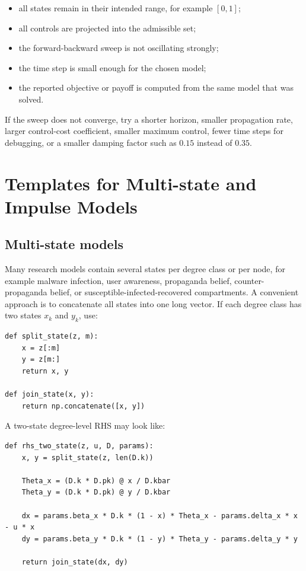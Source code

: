 \documentclass[11pt,a4paper]{article}
\begin{document}
\begin{itemize}
  \item all states remain in their intended range, for example \([0,1]\);
  \item all controls are projected into the admissible set;
  \item the forward-backward sweep is not oscillating strongly;
  \item the time step is small enough for the chosen model;
  \item the reported objective or payoff is computed from the same model that was solved.
\end{itemize}

If the sweep does not converge, try a shorter horizon, smaller propagation rate, larger control-cost coefficient, smaller maximum control, fewer time steps for debugging, or a smaller damping factor such as \(0.15\) instead of \(0.35\).

\section{Templates for Multi-state and Impulse Models}

\subsection{Multi-state models}

Many research models contain several states per degree class or per node, for example malware infection, user awareness, propaganda belief, counter-propaganda belief, or susceptible-infected-recovered compartments. A convenient approach is to concatenate all states into one long vector. If each degree class has two states \(x_k\) and \(y_k\), use:

\begin{lstlisting}[style=py]
def split_state(z, m):
    x = z[:m]
    y = z[m:]
    return x, y

def join_state(x, y):
    return np.concatenate([x, y])
\end{lstlisting}

A two-state degree-level RHS may look like:

\begin{lstlisting}[style=py]
def rhs_two_state(z, u, D, params):
    x, y = split_state(z, len(D.k))

    Theta_x = (D.k * D.pk) @ x / D.kbar
    Theta_y = (D.k * D.pk) @ y / D.kbar

    dx = params.beta_x * D.k * (1 - x) * Theta_x - params.delta_x * x - u * x
    dy = params.beta_y * D.k * (1 - y) * Theta_y - params.delta_y * y

    return join_state(dx, dy)
\end{lstlisting}
\end{document}
